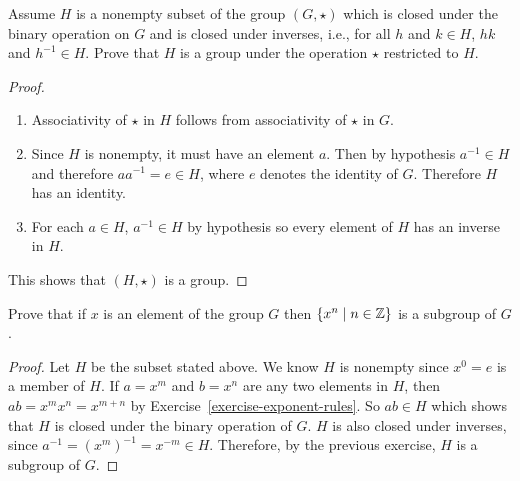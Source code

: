  Assume $H$ is a nonempty subset of the group $(G,\star)$
which is closed under the binary operation on $G$ and is closed under
inverses, i.e., for all $h$ and $k\in H$, $hk$ and $h^{-1}\in
H$. Prove that $H$ is a group under the operation $\star$ restricted
to $H$.
\begin{proof}
  \begin{enumerate}
  \item Associativity of $\star$ in $H$ follows from associativity of
    $\star$ in $G$.

  \item Since $H$ is nonempty, it must have an element $a$. Then by
    hypothesis $a^{-1}\in H$ and therefore $aa^{-1} = e \in H$, where
    $e$ denotes the identity of $G$. Therefore $H$ has an identity.

  \item For each $a\in H$, $a^{-1}\in H$ by hypothesis so every
    element of $H$ has an inverse in $H$.
  \end{enumerate}

  This shows that $(H,\star)$ is a group.
\end{proof}

 Prove that if $x$ is an element of the group $G$ then
$\{x^n \mid n\in\mathbb{Z}\}$ is a subgroup of $G$.
\begin{proof}
  Let $H$ be the subset stated above. We know $H$ is nonempty since
  $x^0 = e$ is a member of $H$. If $a = x^m$ and $b = x^n$ are any two
  elements in $H$, then $ab = x^mx^n = x^{m+n}$ by
  Exercise~\ref{exercise-exponent-rules}. So $ab\in H$ which shows
  that $H$ is closed under the binary operation of $G$. $H$ is also
  closed under inverses, since $a^{-1} = (x^m)^{-1} = x^{-m}\in
  H$. Therefore, by the previous exercise, $H$ is a subgroup of $G$.
\end{proof}

